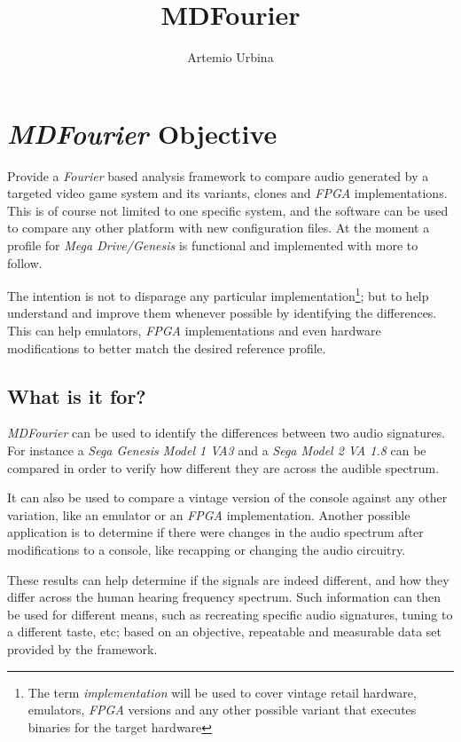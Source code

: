 \documentclass[10pt,a4paper]{report}
\title{MDFourier}
\author{Artemio Urbina}
\begin{document}
\begin{titlepage}
	\maketitle
	\thispagestyle{empty}
\end{titlepage}

\tableofcontents

\chapter{\textit{MDFourier} Objective}

Provide a \textit{Fourier} based analysis framework to compare audio generated by a targeted video game system and its variants, clones and \textit{FPGA} implementations. This is of course not limited to one specific system, and the software can be used to compare any other platform with new configuration files. At the moment a profile for \textit{Mega Drive/Genesis} is functional and implemented with more to follow.

The intention is not to disparage any particular implementation\footnote{The term \textit{implementation} will be used to cover vintage retail hardware, emulators, \textit{FPGA} versions and any other possible variant that executes binaries for the target hardware}; but to help understand and improve them whenever possible by identifying the differences. This can help emulators, \textit{FPGA} implementations and even hardware modifications to better match the desired reference profile.

\section{What is it for?}

\textit{MDFourier} can be used to identify the differences between two audio signatures. For instance a \textit{Sega Genesis Model 1 VA3} and a \textit{Sega Model 2 VA 1.8} can be compared in order to verify how different they are across the audible spectrum. 

It can also be used to compare a vintage version of the console against any other variation, like an emulator or an \textit{FPGA} implementation. Another possible application is to determine if there were changes in the audio spectrum after modifications to a console, like recapping or changing the audio circuitry.

These results can help determine if the signals are indeed different, and how they differ across the human hearing frequency spectrum. Such information can then be used for different means, such as recreating specific audio signatures, tuning to a different taste, etc; based on an objective, repeatable and measurable data set provided by the framework.
\end{document}

